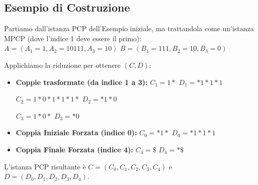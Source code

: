 \documentclass[a4paper]{article}
\theoremstyle{definition} %
\theoremstyle{remark} %
\begin{document}
\subsection{Esempio di Costruzione}
Partiamo dall'istanza PCP dell'Esempio iniziale, ma trattandola come un'istanza MPCP (dove l'indice 1 deve essere il primo):
$A = (A_1 = 1, A_2 = 10111, A_3 = 10)$
$B = (B_1 = 111, B_2 = 10, B_3 = 0)$

Applichiamo la riduzione per ottenere $(C, D)$:
\begin{itemize}
    \item \textbf{Coppie trasformate (da indice 1 a 3):}
    $C_1 = 1*$
    $D_1 = *1*1*1$

    $C_2 = 1*0*1*1*1*$
    $D_2 = *1*0$

    $C_3 = 1*0*$
    $D_3 = *0$

    \item \textbf{Coppia Iniziale Forzata (indice 0):}
    $C_0 = *1*$
    $D_0 = *1*1*1$

    \item \textbf{Coppia Finale Forzata (indice 4):}
    $C_4 = \$$
    $D_4 = *\$$
\end{itemize}
L'istanza PCP risultante è $C=(C_0, C_1, C_2, C_3, C_4)$ e $D=(D_0, D_1, D_2, D_3, D_4)$.
\end{document}
